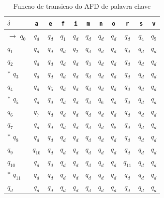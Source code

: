 \begin{table}[htb]
\centering
\caption{Funcao de transicao do AFD de palavra chave}
\label{tab:afd-palavra-chave}
\begin{tabular}{l|cccccccccc}
\hline
$\delta$ & \texttt{a} & \texttt{e} & \texttt{f} & \texttt{i} & \texttt{m} & \texttt{n} & \texttt{o} & \texttt{r} & \texttt{s} & \texttt{v} \\
\hline
$\rightarrow$ $q_{0}$ & $q_{d}$ & $q_{d}$ & $q_{1}$ & $q_{d}$ & $q_{d}$ & $q_{d}$ & $q_{d}$ & $q_{d}$ & $q_{4}$ & $q_{9}$ \\
$q_{1}$ & $q_{d}$ & $q_{d}$ & $q_{d}$ & $q_{2}$ & $q_{d}$ & $q_{d}$ & $q_{d}$ & $q_{d}$ & $q_{d}$ & $q_{d}$ \\
$q_{2}$ & $q_{d}$ & $q_{d}$ & $q_{d}$ & $q_{d}$ & $q_{3}$ & $q_{d}$ & $q_{d}$ & $q_{d}$ & $q_{d}$ & $q_{d}$ \\
$*$ $q_{3}$ & $q_{d}$ & $q_{d}$ & $q_{d}$ & $q_{d}$ & $q_{d}$ & $q_{d}$ & $q_{d}$ & $q_{d}$ & $q_{d}$ & $q_{d}$ \\
$q_{4}$ & $q_{d}$ & $q_{5}$ & $q_{d}$ & $q_{d}$ & $q_{d}$ & $q_{d}$ & $q_{d}$ & $q_{d}$ & $q_{d}$ & $q_{d}$ \\
$*$ $q_{5}$ & $q_{d}$ & $q_{d}$ & $q_{d}$ & $q_{d}$ & $q_{d}$ & $q_{6}$ & $q_{d}$ & $q_{d}$ & $q_{d}$ & $q_{d}$ \\
$q_{6}$ & $q_{7}$ & $q_{d}$ & $q_{d}$ & $q_{d}$ & $q_{d}$ & $q_{d}$ & $q_{d}$ & $q_{d}$ & $q_{d}$ & $q_{d}$ \\
$q_{7}$ & $q_{d}$ & $q_{d}$ & $q_{d}$ & $q_{d}$ & $q_{d}$ & $q_{d}$ & $q_{8}$ & $q_{d}$ & $q_{d}$ & $q_{d}$ \\
$*$ $q_{8}$ & $q_{d}$ & $q_{d}$ & $q_{d}$ & $q_{d}$ & $q_{d}$ & $q_{d}$ & $q_{d}$ & $q_{d}$ & $q_{d}$ & $q_{d}$ \\
$q_{9}$ & $q_{10}$ & $q_{d}$ & $q_{d}$ & $q_{d}$ & $q_{d}$ & $q_{d}$ & $q_{d}$ & $q_{d}$ & $q_{d}$ & $q_{d}$ \\
$q_{10}$ & $q_{d}$ & $q_{d}$ & $q_{d}$ & $q_{d}$ & $q_{d}$ & $q_{d}$ & $q_{d}$ & $q_{11}$ & $q_{d}$ & $q_{d}$ \\
$*$ $q_{11}$ & $q_{d}$ & $q_{d}$ & $q_{d}$ & $q_{d}$ & $q_{d}$ & $q_{d}$ & $q_{d}$ & $q_{d}$ & $q_{d}$ & $q_{d}$ \\
$q_{d}$ & $q_{d}$ & $q_{d}$ & $q_{d}$ & $q_{d}$ & $q_{d}$ & $q_{d}$ & $q_{d}$ & $q_{d}$ & $q_{d}$ & $q_{d}$ \\
\hline
\end{tabular}
\end{table}
